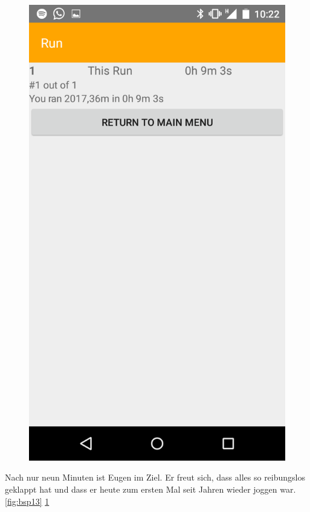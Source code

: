 \begin{figure}
\begin{minipage}{.4\textwidth}
  \includegraphics[width=.8\linewidth]{abb/bsp/bsp14}
  \label{fig:bsp14}
\end{minipage}
\end{figure}

Nach nur neun Minuten ist Eugen im Ziel. Er freut sich, dass alles so reibungslos geklappt hat und dass er heute zum ersten Mal seit Jahren wieder joggen war. \ref{fig:bsp13} \ref{fig:bsp14}

